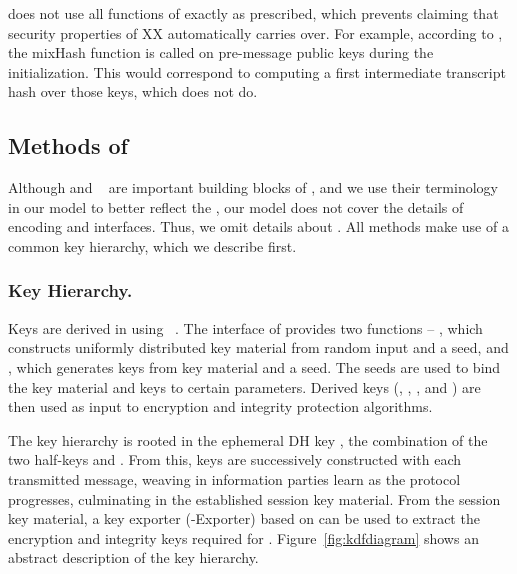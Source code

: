 \mEdhoc{} does not use all functions of \mNoise{} exactly as prescribed, which
prevents claiming that security properties of XX
automatically carries over.
%
For example, according to \mNoise{}, the mixHash function is called on
pre-message public keys during the initialization.
%
This would correspond to \mEdhoc{} computing a first intermediate transcript
hash over those keys, which \mEdhoc{} does not do.
%

\spacehack
\subsection{Methods of \mEdhoc{}}
\label{sec:methods}
\fillhack
Although \mCbor{} and \mCose{}~\cite{rfc8152} are important building blocks of
\mEdhoc{}, and we use their terminology in our model to better reflect the
\mSpec{}, our model does not cover the details of encoding and \mCose{}
interfaces.
%
Thus, we omit details about \mCose{}.
%
All methods make use of a common key hierarchy, which we describe first.
%

\spacehack
\subsubsection{Key Hierarchy.}
\label{sec:keyHierarchy}

Keys are derived in \mEdhoc{} using \mHkdf{}~\cite{rfc5869}.
%
The interface of \mHkdf{} provides two functions -- \mHkdfExtract{}, which
constructs uniformly distributed key material from random input and a seed,
and \mHkdfExpand{}, which generates keys from key material and a seed.
%
The seeds are used to bind the key material and keys to certain parameters.
%
Derived keys (\mKtwoe, \mKtwom{}, \mKthreeae, and \mKthreem) are then used as input to encryption and integrity protection
algorithms.
%

The key hierarchy is rooted in the ephemeral DH key \mGxy{}, the combination
of the two half-keys \mGx{} and \mGy{}.
%
From this, keys are successively constructed with each transmitted message,
weaving in information parties learn as the protocol progresses, culminating
in the established session key material.
%
From the session key material, a key exporter (\mEdhoc-Exporter) based on
\mHkdf{} can be used to extract the encryption and integrity keys required
for \mOscore{}.
%
Figure~\ref{fig:kdfdiagram} shows an abstract description of the key hierarchy.
%

